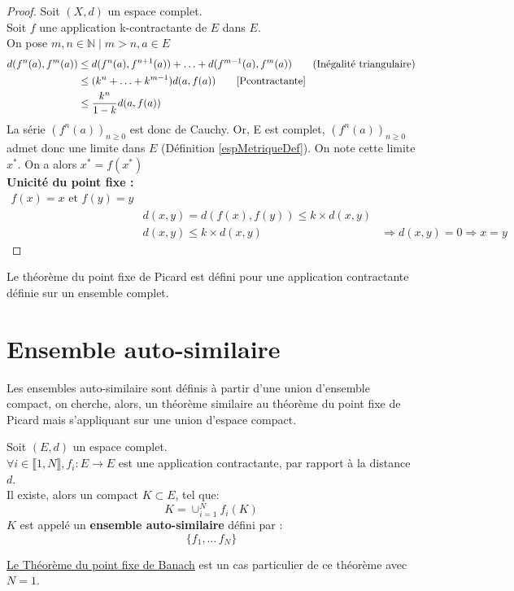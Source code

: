 \documentclass[a4paper, 12pt]{report}
\begin{document}
			\begin{proof}
				Soit $(X,d)$ un espace complet.\\
				Soit $f$ une application k-contractante de $E$ dans $E$.\\
				On pose $m,n\in\mathds{N}\mid m>n,a\in E$\\
				\begin{align*}
					d(f^n(a),f^m(a))&\leq d(f^n(a),f^{n+1}(a))+\ldots+d(f^{m-1}(a),f^m(a))  \tag{Inégalité triangulaire}\\
									&\leq (k^n+\ldots+k^{m-1})d(a,f(a)) \tag*{\eqref{Pcontractante}}\\
									&\leq \frac{k^n}{1-k}d(a,f(a))
				\end{align*}
				La série $(f^n(a))_{n\geq 0}$ est donc de Cauchy. Or, E est complet, $(f^n(a))_{n\geq 0}$ admet donc une limite dans $E$ (Définition \ref{espMetriqueDef}). On note cette limite $x^*$.
				On a alors $x^*=f(x^*)$\\
				\textbf{Unicité du point fixe :}
				\begin{align*}
					f(x)=x \textrm{ et } f(y)=y\\
					&d(x,y) = d(f(x),f(y)) \leq k\times d(x,y)\\
					&d(x,y) \leq k\times d(x,y)
					&\Rightarrow d(x,y)=0\Rightarrow x=y \tag{Unicité}
				\end{align*}
			\end{proof}
			\hspace{.7 cm} Le théorème du point fixe de Picard est défini pour une application contractante définie sur un ensemble complet.
\newpage
		\section{Ensemble auto-similaire}
			Les ensembles auto-similaire sont définis à partir d'une union d'ensemble compact, on cherche, alors, un théorème similaire au théorème du point fixe de Picard mais s'appliquant sur une union d'espace compact.
			\begin{theorem}
			\label{thmPrincipale}
				Soit $(E,d)$ un espace complet.\\
				$\forall i \in \llbracket 1,N \rrbracket, f_i:E \longrightarrow E$ est une application contractante, par rapport à la distance $d$.\\
				Il existe, alors un compact $K\subset E$, tel que:
				\begin{equation*}
					K=\cup^N_{i=1}f_i(K)
				\end{equation*}
				$K$ est appelé un \textbf{ensemble auto-similaire} défini par :
				\begin{equation*}
					\{f_1,\ldots\,f_N\}
				\end{equation*}
			\end{theorem}
			\begin{remark*}
			\hyperref[ThmPtFixe]{Le Théorème du point fixe de Banach} est un cas particulier de ce théorème avec $N=1$.
			\end{remark*}
		
\end{document}
